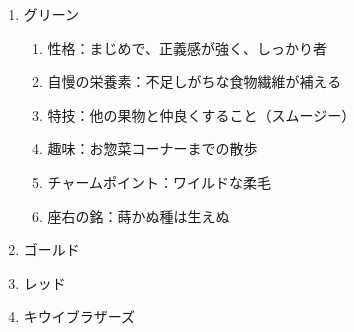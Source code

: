\begin{enumerate}[label=(\arabic*)] %
        \item グリーン

        \begin{enumerate}[label=\textbullet]
            \item 性格：まじめで、正義感が強く、しっかり者
            \item 自慢の栄養素：不足しがちな食物繊維が補える
            \item 特技：他の果物と仲良くすること（スムージー）
            \item 趣味：お惣菜コーナーまでの散歩
            \item チャームポイント：ワイルドな柔毛
            \item 座右の銘：蒔かぬ種は生えぬ
        \end{enumerate}

        \item ゴールド
        \item レッド
        \item キウイブラザーズ
\end{enumerate}
